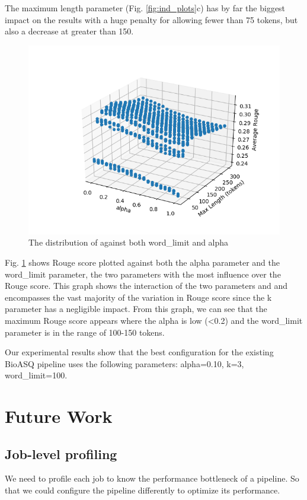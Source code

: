 \documentclass{article}
\begin{document}
    The maximum length parameter (Fig. \ref{fig:ind_plots}c) has by far the biggest impact on the results with a huge penalty for allowing fewer than 75 tokens, but also a decrease at greater than 150.

    \begin{figure}[H]
        \begin{center}
            \includegraphics[width=\textwidth]{fig/alpha_wordcount.png}
        \end{center}
        \caption{The distribution of against both word\_limit and alpha}\label{fig:alpha_wordcount}
    \end{figure}

    Fig. \ref{fig:alpha_wordcount} shows Rouge score plotted against both the alpha parameter and the word\_limit parameter, the two parameters with the most influence over the Rouge score.
    This graph shows the interaction of the two parameters and and encompasses the vast majority of the variation in Rouge score since the k parameter has a negligible impact. From this graph,
    we can see that the maximum Rouge score appears where the alpha is low (<0.2) and the word\_limit parameter is in the range of 100-150 tokens.

    Our experimental results show that the best configuration for the existing BioASQ pipeline uses the following parameters: alpha=0.10, k=3, word\_limit=100.


\section{Future Work}
    \subsection{Job-level profiling}
    We need to profile each job to know the performance bottleneck of a pipeline.
    So that we could configure the pipeline differently to optimize its performance.
\end{document}
